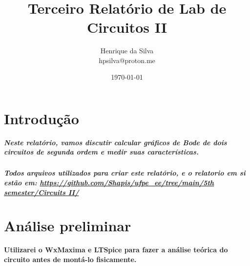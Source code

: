 \documentclass[12pt,twoside, a4paper, twocolumn]{article}
\title{Terceiro Relatório de Lab de Circuitos II}
\author{Henrique da Silva \\ hpsilva@proton.me}
\date{\today}
\begin{document}
\maketitle
{}
\newpage
\tableofcontents
\newpage




\section{Introdução}








\subparagraph*{Neste relatório, vamos discutir calcular gráficos de Bode de dois circuitos de segunda ordem e medir suas características.}








\subparagraph*{Todos arquivos utilizados para criar este relatório, e o relatorio em si estão em:  \url{https://github.com/Shapis/ufpe_ee/tree/main/5th semester/Circuits II/}}
































\section{Análise preliminar}








\paragraph*{Utilizarei o WxMaxima e LTSpice para fazer a análise teórica do circuito antes de montá-lo fisicamente.}
\end{document}
